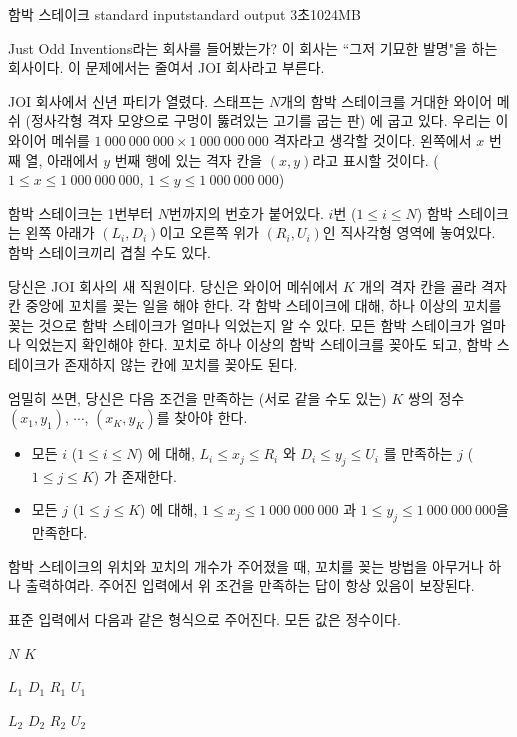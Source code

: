 \begin{problem}{함박 스테이크}
	{standard input}{standard output}
	{3초}{1024MB}{}
	
	Just Odd Inventions라는 회사를 들어봤는가? 이 회사는 ``그저 기묘한 발명"을 하는 회사이다. 이 문제에서는 줄여서 JOI 회사라고 부른다.
	 
	JOI 회사에서 신년 파티가 열렸다. 스태프는 $N$개의 함박 스테이크를 거대한 와이어 메쉬 (정사각형 격자 모양으로 구멍이 뚫려있는 고기를 굽는 판) 에 굽고 있다. 우리는 이 와이어 메쉬를 $1\ 000\ 000\ 000 \times 1\ 000\ 000\ 000$ 격자라고 생각할 것이다. 왼쪽에서 $x$ 번째 열, 아래에서 $y$ 번째 행에 있는 격자 칸을 $(x, y)$라고 표시할 것이다. ($1 \le x \le 1\ 000\ 000\ 000$, $1 \le y \le 1\ 000\ 000\ 000$)
	
	함박 스테이크는 1번부터 $N$번까지의 번호가 붙어있다. $i$번 ($1 \le i \le N$) 함박 스테이크는 왼쪽 아래가 $(L_i, D_i)$이고 오른쪽 위가 $(R_i, U_i)$인 직사각형 영역에 놓여있다. 함박 스테이크끼리 겹칠 수도 있다.
	
	당신은 JOI 회사의 새 직원이다. 당신은 와이어 메쉬에서 $K$ 개의 격자 칸을 골라 격자 칸 중앙에 꼬치를 꽂는 일을 해야 한다. 각 함박 스테이크에 대해, 하나 이상의 꼬치를 꽂는 것으로 함박 스테이크가 얼마나 익었는지 알 수 있다. 모든 함박 스테이크가 얼마나 익었는지 확인해야 한다. 꼬치로 하나 이상의 함박 스테이크를 꽂아도 되고, 함박 스테이크가 존재하지 않는 칸에 꼬치를 꽂아도 된다.
	
	엄밀히 쓰면, 당신은 다음 조건을 만족하는 (서로 같을 수도 있는) $K$ 쌍의 정수 $(x_1, y_1)$, $\cdots$, $(x_K, y_K)$를 찾아야 한다.
	
	\begin{itemize}
		\item 모든 $i$ ($1 \le i \le N$) 에 대해, $L_i \le x_j \le R_i$ 와 $D_i \le y_j \le U_i$ 를 만족하는 $j$ ($1 \le j \le K$) 가 존재한다.
		\item 모든 $j$ ($1 \le j \le K$) 에 대해, $1 \le x_j \le 1\ 000\ 000\ 000$ 과 $1 \le y_j \le 1\ 000\ 000\ 000$을 만족한다.
	\end{itemize}

	함박 스테이크의 위치와 꼬치의 개수가 주어졌을 때, 꼬치를 꽂는 방법을 아무거나 하나 출력하여라. 주어진 입력에서 위 조건을 만족하는 답이 항상 있음이 보장된다.

	
\InputFile

표준 입력에서 다음과 같은 형식으로 주어진다. 모든 값은 정수이다.

$N$ $K$

$L_1$ $D_1$ $R_1$ $U_1$

$L_2$ $D_2$ $R_2$ $U_2$


\end{problem}
